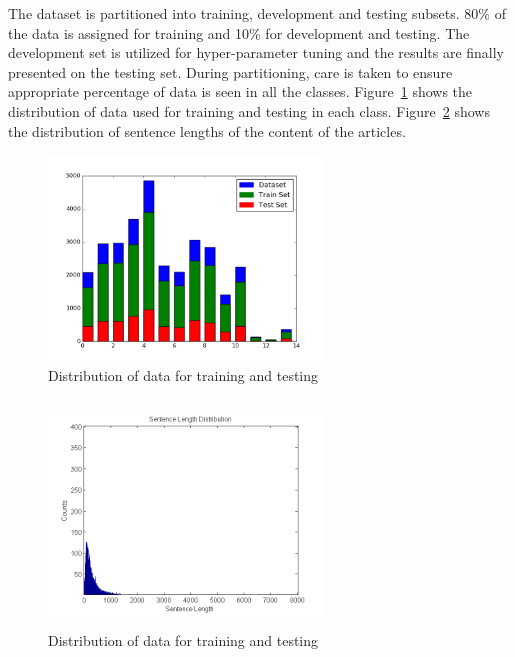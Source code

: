 \documentclass[12pt]{article}
\begin{document}

The dataset is partitioned into training, development and testing subsets. 80\% of the data is assigned for training and 10\% for development and testing. The development set is utilized for hyper-parameter tuning and the results are finally presented on the testing set. During partitioning, care is taken to ensure appropriate percentage of data is seen in all the classes. Figure~\ref{fig:dist} shows the distribution of data used for training and testing in each class. Figure~\ref{fig:sent_dist} shows the distribution of sentence lengths of the content of the articles.

\begin{figure}[h!]
\centering
\includegraphics[width=0.65\textwidth]{figures/test_class_distribution.png}
\caption{Distribution of data for training and testing}\label{fig:dist}
\end{figure}

\begin{figure}[t]
\centering
\includegraphics[width=0.65\textwidth,height=6cm]{figures/sentence_length.png}
\caption{Distribution of data for training and testing}\label{fig:sent_dist}
\end{figure}
\end{document}
